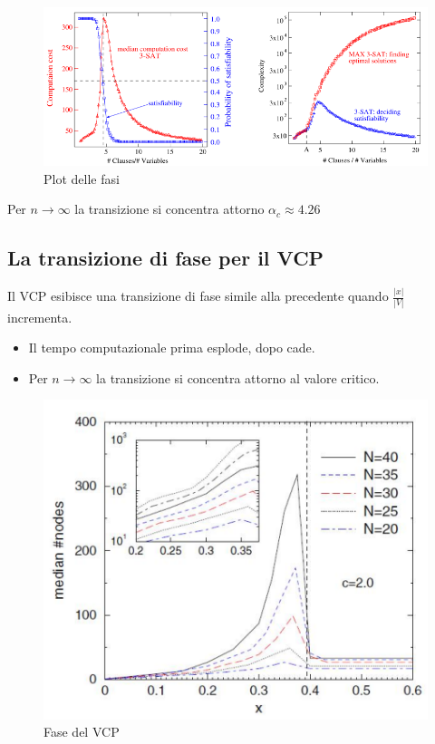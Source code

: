 \documentclass{article}
\begin{document}
\begin{figure}[H]
    \centering
    \includegraphics[scale=0.52]{images/max_sat_SAT.png}
    \caption{Plot delle fasi}
\end{figure}

Per $n\rightarrow\infty$ la transizione si concentra attorno $\alpha_c\approx 4.26$
\subsection{La transizione di fase per il VCP}
Il VCP esibisce una transizione di fase simile alla precedente quando $\frac{|x|}{|V|}$
incrementa.
\begin{itemize}
    \item Il tempo computazionale prima esplode, dopo cade.
    \item Per $n\rightarrow\infty$ la transizione si concentra attorno al valore critico.
\end{itemize}

\begin{figure}[H]
    \centering
    \includegraphics[scale=0.7]{images/phase_VCP.png}
    \caption{Fase del VCP}
\end{figure}
\end{document}
